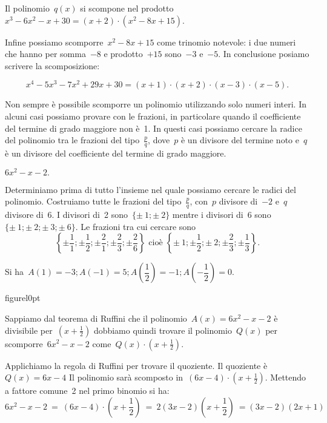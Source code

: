 Il polinomio~$q(x)$ si scompone nel
prodotto~$x^{3}-6x^{2}-x+30=(x+2)\cdot (x^{2}-8x+15)$.

Infine possiamo scomporre~$x^{2}-8x+15$ come trinomio notevole: i due
numeri che hanno per somma~$-8$ e prodotto~$+15$ sono~$-3$ e~$-5$. In
conclusione posiamo scrivere la scomposizione:

\[x^{4}-5x^{3}-7x^{2}+29x+30=(x+1)\cdot (x+2)\cdot (x-3)\cdot (x-5).\]

Non sempre è possibile scomporre un polinomio utilizzando solo numeri
interi. In alcuni casi possiamo provare con le frazioni, in particolare
quando il coefficiente del termine di grado maggiore non è~1. In
questi casi possiamo cercare la radice del polinomio tra le frazioni
del tipo~$\frac{p}{q}$, dove~$p$ è un divisore del termine noto e~$q$ è
un divisore del coefficiente del termine di grado maggiore.


\begin{esempio}
$6x^{2}-x-2.$
\end{esempio}

Determiniamo prima di tutto l'insieme nel quale
possiamo cercare le radici del polinomio. Costruiamo tutte le frazioni
del tipo~$\frac{p}{q}$, con~$p$ divisore di~$-2$ e~$q$ divisore di~$6$. I
divisori di~2 sono~$\{\pm~1;\pm~2\}$ 
mentre i divisori di~6 sono~$\{\pm~1;\pm~2;\pm~3;\pm~6\}$.
Le frazioni tra cui cercare sono
\[\left\{\pm {\frac{1}{1}};\pm \frac{1}{2};\pm \frac{2}{1};\pm
\frac{2}{3};\pm \frac{2}{6}\right\}
\text{ cioè }
\left\{\pm~1;\pm\frac{1}{2};\pm~2;\pm \frac{2}{3};\pm \frac{1}{3}\right\}.\]

Si ha~$A(1)=-3; A(-1)=5; A\left(\dfrac{1}{2}\right)=
       -1; A\left(-{\dfrac{1}{2}}\right)=0$.

\begin{wrapfloat}{figure}{l}{0pt}
 
\end{wrapfloat}
Sappiamo dal teorema di Ruffini che il polinomio~$A(x)=6x^{2}-x-2$ è
divisibile per~$\left(x+\frac{1}{2}\right)$ dobbiamo quindi trovare il
polinomio~$Q(x)$ per scomporre~$6x^{2}-x-2$ 
come~$Q(x)\cdot \left(x+\frac{1}{2}\right)$.

Applichiamo la regola di Ruffini per trovare il quoziente. 
Il quoziente è~$Q(x)=6x-4$
Il polinomio sarà scomposto in~$(6x-4)\cdot\left(x+\frac{1}{2}\right)$.
Mettendo a fattore comune~2 nel primo binomio si ha:
\[6x^{2}-x-2\ =
\ (6x-4)\cdot \left(x+\frac{1}{2}\right)\ =
\ 2(3x-2)\left(x+\frac{1}{2}\right)\ =(3x-2)(2x+1)\]



